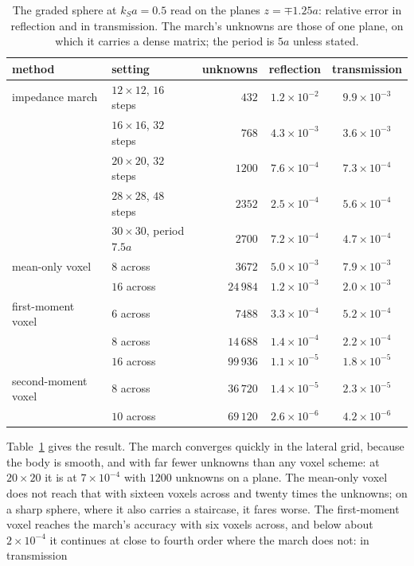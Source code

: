 \documentclass[preprint,review,12pt]{elsarticle}
\begin{document}
\begin{table}[htbp]
\centering
\caption{The graded sphere at $k_Sa=0.5$ read on the planes $z=\mp1.25a$: relative error in reflection
and in transmission. The march's unknowns are those of one plane, on which it carries a dense matrix;
the period is $5a$ unless stated.}\label{tab:march}
\small
\begin{tabular}{@{}llrcc@{}}
\toprule
method & setting & unknowns & reflection & transmission \\
\midrule
impedance march & $12\times12$, $16$ steps & $432$ & $1.2\times10^{-2}$ & $9.9\times10^{-3}$ \\
 & $16\times16$, $32$ steps & $768$ & $4.3\times10^{-3}$ & $3.6\times10^{-3}$ \\
 & $20\times20$, $32$ steps & $1200$ & $7.6\times10^{-4}$ & $7.3\times10^{-4}$ \\
 & $28\times28$, $48$ steps & $2352$ & $2.5\times10^{-4}$ & $5.6\times10^{-4}$ \\
 & $30\times30$, period $7.5a$ & $2700$ & $7.2\times10^{-4}$ & $4.7\times10^{-4}$ \\
mean-only voxel & $8$ across & $3672$ & $5.0\times10^{-3}$ & $7.9\times10^{-3}$ \\
 & $16$ across & $24\,984$ & $1.2\times10^{-3}$ & $2.0\times10^{-3}$ \\
first-moment voxel & $6$ across & $7488$ & $3.3\times10^{-4}$ & $5.2\times10^{-4}$ \\
 & $8$ across & $14\,688$ & $1.4\times10^{-4}$ & $2.2\times10^{-4}$ \\
 & $16$ across & $99\,936$ & $1.1\times10^{-5}$ & $1.8\times10^{-5}$ \\
second-moment voxel & $8$ across & $36\,720$ & $1.4\times10^{-5}$ & $2.3\times10^{-5}$ \\
 & $10$ across & $69\,120$ & $2.6\times10^{-6}$ & $4.2\times10^{-6}$ \\
\bottomrule
\end{tabular}
\end{table}
Table~\ref{tab:march} gives the result. The march converges quickly in the lateral grid, because the
body is smooth, and with far fewer unknowns than any voxel scheme: at $20\times20$ it is at
$7\times10^{-4}$ with $1200$ unknowns on a plane. The mean-only voxel does not reach that with sixteen
voxels across and twenty times the unknowns; on a sharp sphere, where it also carries a staircase, it
fares worse. The first-moment voxel reaches the march's accuracy with six voxels across, and below
about $2\times10^{-4}$ it continues at close to fourth order where the march does not: in transmission
\end{document}
